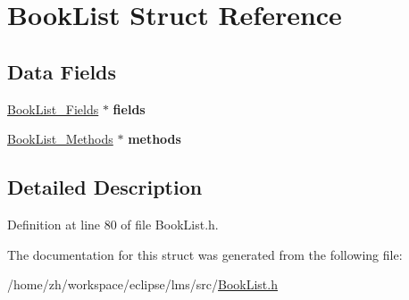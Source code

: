 \hypertarget{structBookList}{\section{Book\-List Struct Reference}
\label{structBookList}
}
\subsection*{Data Fields}
\begin{DoxyCompactItemize}
\item 
\hypertarget{structBookList_a6939a59f97529f265e8a693b70070162}{\hyperlink{structBookList__Fields}{Book\-List\-\_\-\-Fields} $\ast$ {\bfseries fields}}\label{structBookList_a6939a59f97529f265e8a693b70070162}

\item 
\hypertarget{structBookList_ae155960c50bff46036ebfa631b9d7b6c}{\hyperlink{structBookList__Methods}{Book\-List\-\_\-\-Methods} $\ast$ {\bfseries methods}}\label{structBookList_ae155960c50bff46036ebfa631b9d7b6c}

\end{DoxyCompactItemize}


\subsection{Detailed Description}


Definition at line 80 of file Book\-List.\-h.



The documentation for this struct was generated from the following file\-:\begin{DoxyCompactItemize}
\item 
/home/zh/workspace/eclipse/lms/src/\hyperlink{BookList_8h}{Book\-List.\-h}\end{DoxyCompactItemize}
